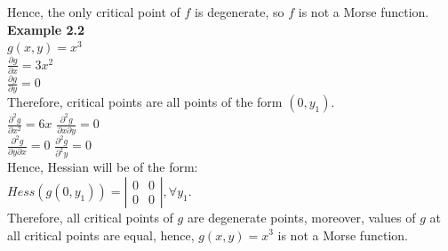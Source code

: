 \documentclass[]{article}
\begin{document}
Hence, the only critical point of $f$ is degenerate, so $f$ is not a Morse function. \\
\textbf{Example 2.2}\\
$g(x,y)=x^3$\\
$\frac{\partial g}{\partial x}=3x^2$\\
$\frac{\partial g}{\partial y}=0$\\
Therefore, critical points are all points of the form $(0, y_1)$.\\
$\frac{\partial^2 g}{\partial x^2}=6x$
$\frac{\partial^2 g}{\partial x \partial y}=0$\\
$\frac{\partial^2 g}{\partial y \partial x}=0$
$\frac{\partial^2 g}{\partial^2 y}=0$\\
Hence, Hessian will be of the form: \\
$Hess(g(0,y_1))=\left| \begin{array}{cc} 0 & 0 \\ 0 & 0 \end{array} \right|,  \forall y_1$. \\
Therefore, all critical points of $g$ are degenerate points, moreover, values of $g$ at all critical points are equal, hence, $g(x,y)=x^3$ is not a Morse function. 
\end{document}
